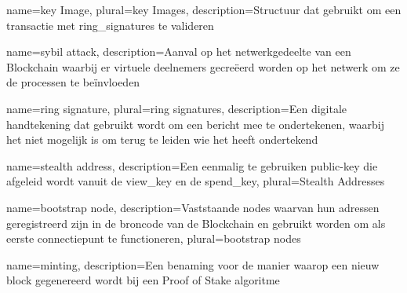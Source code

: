 



 {
  name={key Image},
  plural={key Images},
  description={Structuur dat gebruikt om een transactie met \glspl{ring_signature} te valideren}
}

 {
  name={sybil attack},
  description={Aanval op het netwerkgedeelte van een Blockchain waarbij er virtuele deelnemers gecreëerd worden op het netwerk om ze de processen te beïnvloeden}
}

 {
  name={ring signature},
  plural={ring signatures},
  description={Een digitale handtekening dat gebruikt wordt om een bericht mee te ondertekenen, waarbij het niet mogelijk is om terug te leiden wie het heeft ondertekend}
}

 {
  name={stealth address},
  description={Een eenmalig te gebruiken public-key die afgeleid wordt vanuit de \gls{view_key} en de \gls{spend_key}},
  plural={Stealth Addresses}
}



 {
  name={bootstrap node},
  description={Vaststaande nodes waarvan hun adressen geregistreerd zijn in de broncode van de Blockchain en gebruikt worden om als eerste connectiepunt te functioneren},
  plural={bootstrap nodes}
}

 {
  name={minting},
  description={Een benaming voor de manier waarop een nieuw block gegenereerd wordt bij een Proof of Stake algoritme}
}

